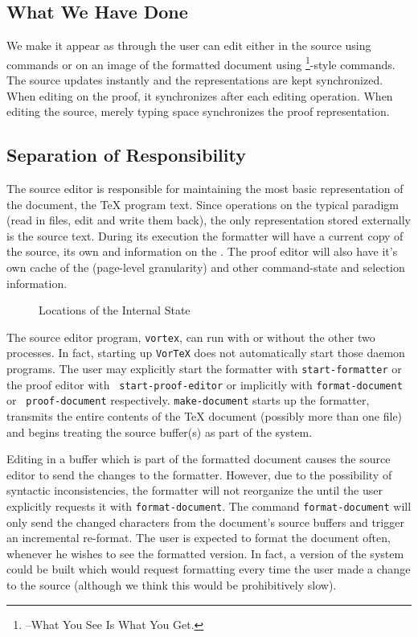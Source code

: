 \subsection{What We Have Done}

We make it appear as through the user can edit either in the source
using {\EMACS} commands or on an image of the formatted document using
\WYSIWYG\footnote{\WYSIWYG--What You See Is What You Get.}-style commands.
The source updates instantly and the representations are kept
synchronized.  When editing on the proof, it synchronizes after each
editing operation.  When editing the source, merely typing space
synchronizes the proof representation.

\subsection{Separation of Responsibility}

The source editor is responsible for maintaining the most basic representation
of the document, the {\TeX} program text.  Since {\VorTeX} operations on the
typical {\UNIX} paradigm (read in files, edit and write them back), the only
representation stored externally is the source text.  During its execution
the formatter will have a current copy of the source, its own {\IRI} and
information on the {\IRT}.  The proof editor will also have it's own cache
of the {\IRT} (page-level granularity) and other command-state and selection
information.

\begin{figure}
    \centerline{}
    \caption{Locations of the Internal State}
\end{figure}

The source editor program, {\tt vortex}, can run with or without the other
two processes.  In fact, starting up {\tt VorTeX} does not automatically
start those daemon programs.  The user may explicitly start the formatter
with {\tt start-formatter} or the proof editor with {\tt
start-proof-editor} or implicitly with {\tt format-document} or {\tt
proof-document} respectively.  {\tt make-document} starts up the formatter,
transmits the entire contents of the {\TeX} document (possibly more than
one file) and begins treating the source buffer(s) as part of the {\WYSIWYG}
system.

Editing in a buffer which is part of the formatted document causes the
source editor to send the changes to the formatter.  However, due to the
possibility of syntactic inconsistencies, the formatter will not reorganize
the {\IRI} until the user explicitly requests it with {\tt format-document}.
The command {\tt format-document} will only send the changed characters from
the document's source buffers and trigger an incremental re-format.  The
user is expected to format the document often, whenever he wishes to see the
formatted version.  In fact, a version of the system could be built which
would request formatting every time the user made a change to the source
(although we think this would be prohibitively slow).

